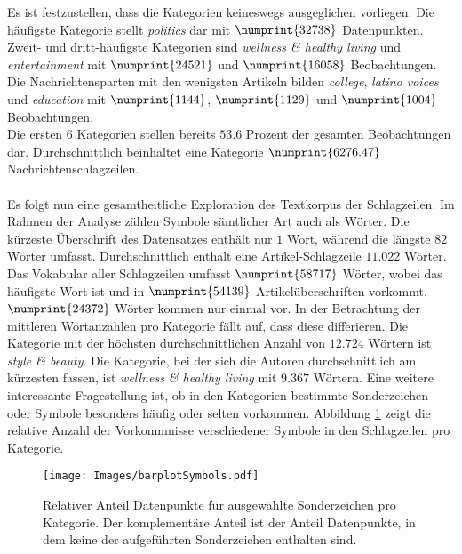 \documentclass[a4paper,11pt]{article}
\begin{document}
Es ist festzustellen, dass die Kategorien keineswegs ausgeglichen vorliegen. Die häufigste Kategorie stellt \textit{politics} dar mit $\numprint{32738}$ Datenpunkten. Zweit- und dritt-häufigste Kategorien sind \textit{wellness \& healthy living} und \textit{entertainment} mit $\numprint{24521}$ und $\numprint{16058}$ Beobachtungen. Die Nachrichtensparten mit den wenigsten Artikeln bilden \textit{college}, \textit{latino voices} und \textit{education} mit $\numprint{1144}$, $\numprint{1129}$ und $\numprint{1004}$ Beobachtungen.\\
Die ersten $6$ Kategorien stellen bereits $53.6$ Prozent der gesamten Beobachtungen dar. Durchschnittlich beinhaltet eine Kategorie $\numprint{6276.47}$ Nachrichtenschlagzeilen.\\
\\
Es folgt nun eine gesamtheitliche Exploration des Textkorpus der Schlagzeilen. Im Rahmen der Analyse zählen Symbole sämtlicher Art auch als Wörter. Die kürzeste Überschrift des Datensatzes enthält nur $1$ Wort, während die längste $82$ Wörter umfasst. Durchschnittlich enthält eine Artikel-Schlagzeile $11.022$ Wörter. Das Vokabular aller Schlagzeilen umfasst $\numprint{58717}$ Wörter, wobei  das häufigste Wort ist und in $\numprint{54139}$ Artikelüberschriften vorkommt. $\numprint{24372}$ Wörter kommen nur einmal vor. In der Betrachtung der mittleren Wortanzahlen pro Kategorie fällt auf, dass diese differieren. Die Kategorie mit der höchsten durchschnittlichen Anzahl von $12.724$ Wörtern ist \textit{style \& beauty}. Die Kategorie, bei der sich die Autoren durchschnittlich am kürzesten fassen, ist \textit{wellness \& healthy living} mit $9.367$ Wörtern. Eine weitere interessante Fragestellung ist, ob in den Kategorien bestimmte Sonderzeichen oder Symbole besonders häufig oder selten vorkommen. Abbildung \ref{abb:barplotSymbols} zeigt die relative Anzahl der Vorkommnisse verschiedener Symbole in den Schlagzeilen pro Kategorie.

\begin{figure}[ht]
    \centering
\texttt{[image: Images/barplotSymbols.pdf]} 
\caption{Relativer Anteil Datenpunkte für ausgewählte Sonderzeichen pro Kategorie. Der komplementäre Anteil ist der Anteil Datenpunkte, in dem keine der aufgeführten Sonderzeichen enthalten sind.}
\label{abb:barplotSymbols}
\end{figure}
\end{document}
